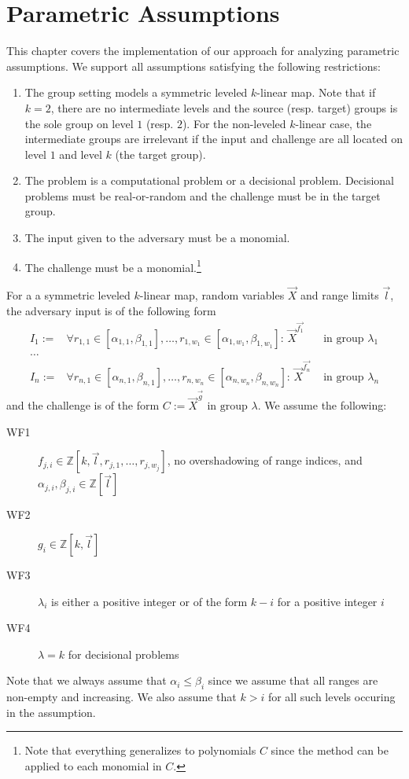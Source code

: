 \chapter{Parametric Assumptions}

This chapter covers the implementation of our approach for
analyzing parametric assumptions.
We support all assumptions satisfying the following restrictions:
\begin{enumerate}
\item The group setting models a symmetric leveled $k$-linear map.
  Note that if $k=2$, there are no intermediate levels and
  the source (resp. target) groups is the sole group on level $1$ (resp. $2$).
  For the non-leveled $k$-linear case, the intermediate groups
  are irrelevant if the input and challenge are all located on
  level $1$ and level $k$ (the target group).
\item The problem is a computational problem or a decisional
 problem. Decisional problems must be real-or-random and
 the challenge must be in the target group.
\item The input given to the adversary must be a monomial.
\item The challenge must be a monomial.\footnote{
    Note that everything generalizes to polynomials $C$ since
    the method can be applied to each monomial in $C$.}
\end{enumerate}%
%
\newcommand{\range}[1]{r_{#1} \in [\alpha_{#1},\beta_{#1}]}%
\renewcommand{\brack}[1]{[#1]}%
%
\label{assumption_def}%
For a a symmetric leveled $k$-linear map,
  random variables $\vec{X}$ and range limits $\vec{l}$,
  the adversary input is of the following form
\begin{align*}
  I_1 :={}& \forall \range{1,1},\ldots,\range{1,w_1}:\, \vec{X}^{\vec{f_{1}}}
    & \text{ in group }\lambda_1\\
  \ldots & \\
  I_n :={}& \forall \range{n,1},\ldots,\range{n,w_n}:\, \vec{X}^{\vec{f_{n}}}
    & \text{ in group }\lambda_n
\end{align*}
  and the challenge is of the form
  $C := \vec{X}^{\vec{g}} \text{ in group }\lambda$.
We assume the following:
\begin{description}
\item[WF1] $f_{j,i} \in \mathbb{Z}[k,\vec{l},r_{j,1},\ldots,r_{j,w_j}]$,
          no overshadowing of range indices, and
          $\alpha_{j,i},\beta_{j,i} \in \mathbb{Z}[\vec{l}]$
\item[WF2] $g_i \in \mathbb{Z}[k,\vec{l}]$
\item[WF3] $\lambda_i$ is either a positive integer or
  of the form $k - i$ for a positive integer $i$
\item[WF4] $\lambda=k$ for decisional problems
\end{description}
%
Note that we always assume that $\alpha_i \leq \beta_i$ since
  we assume that all ranges are non-empty and increasing.
We also assume that $k > i$ for all such levels occuring in the
  assumption.